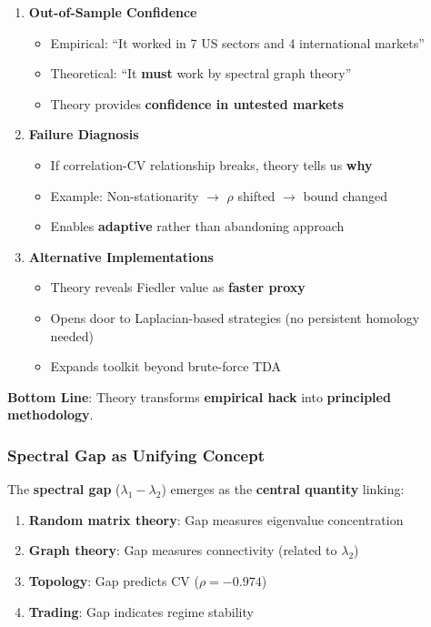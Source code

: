 \begin{enumerate}
\item \textbf{Out-of-Sample Confidence}
   \begin{itemize}
   \item Empirical: ``It worked in 7 US sectors and 4 international markets''
   \item Theoretical: ``It \textbf{must} work by spectral graph theory''
   \item Theory provides \textbf{confidence in untested markets}
   \end{itemize}

\item \textbf{Failure Diagnosis}
   \begin{itemize}
   \item If correlation-CV relationship breaks, theory tells us \textbf{why}
   \item Example: Non-stationarity $\rightarrow$ $\rho$ shifted $\rightarrow$ bound changed
   \item Enables \textbf{adaptive} rather than abandoning approach
   \end{itemize}

\item \textbf{Alternative Implementations}
   \begin{itemize}
   \item Theory reveals Fiedler value as \textbf{faster proxy}
   \item Opens door to Laplacian-based strategies (no persistent homology needed)
   \item Expands toolkit beyond brute-force TDA
   \end{itemize}
\end{enumerate}

\textbf{Bottom Line}: Theory transforms \textbf{empirical hack} into \textbf{principled methodology}.

\subsubsection{Spectral Gap as Unifying Concept}

The \textbf{spectral gap} ($\lambda_1 - \lambda_2$) emerges as the \textbf{central quantity} linking:

\begin{enumerate}
\item \textbf{Random matrix theory}: Gap measures eigenvalue concentration
\item \textbf{Graph theory}: Gap measures connectivity (related to $\lambda_2$)
\item \textbf{Topology}: Gap predicts CV ($\rho = -0.974$)
\item \textbf{Trading}: Gap indicates regime stability
\end{enumerate}

